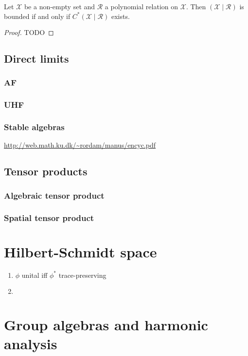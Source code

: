 \begin{proposition}
Let $\mathcal{X}$ be a non-empty set and $\mathcal{R}$ a polynomial relation on $\mathcal{X}$. Then $(\mathcal{X}\;|\; \mathcal{R})$ is bounded if and only if $C^*(\mathcal{X}\;|\;\mathcal{R})$ exists.
\end{proposition}
\begin{proof}
TODO
\end{proof}

\section{Direct limits}
\subsection{AF}
\subsection{UHF}
\subsection{Stable algebras}
\url{http://web.math.ku.dk/~rordam/manus/encyc.pdf}

\section{Tensor products}
\subsection{Algebraic tensor product}
\subsection{Spatial tensor product}

\chapter{Hilbert-Schmidt space}
\begin{proposition}
\begin{enumerate}
\item $\phi$ unital iff $\phi^*$ trace-preserving
\item
\end{enumerate}
\end{proposition}


\chapter{Group algebras and harmonic analysis}
